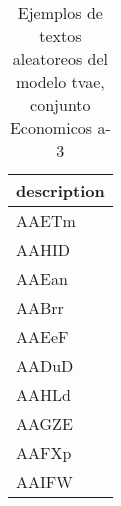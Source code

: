 \begin{table}[H]
\centering
\fontsize{8}{14}\selectfont
\caption{Ejemplos de textos aleatoreos del modelo tvae, conjunto Economicos a-3}
\label{table-sample10-economicos-a-3-tvae-text}
\begin{tabular}{|m{50em}|}
\hline
\rowcolor[gray]{0.8}
description \\
\hline AAETm \\
\hline AAHID \\
\hline AAEan \\
\hline AABrr \\
\hline AAEeF \\
\hline AADuD \\
\hline AAHLd \\
\hline AAGZE \\
\hline AAFXp \\
\hline AAIFW \\
\hline
\end{tabular}
\end{table}
